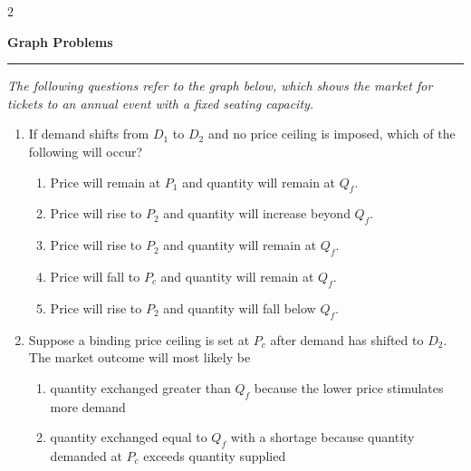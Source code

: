 \documentclass[10pt]{article}
\newenvironment{choiceslist}
  {\begin{enumerate}[label=(\Alph*), leftmargin=1.55em, itemsep=0.1em, topsep=0.15em, parsep=0pt]}
  {\end{enumerate}}
\newenvironment{stimulus}
  {\begin{center}\begin{minipage}{0.97\columnwidth}\footnotesize\itshape\setlength{\tabcolsep}{3pt}\renewcommand{\arraystretch}{0.96}}
  {\end{minipage}\end{center}}
\newcommand{\sectiontitle}[1]{%
  \vspace{0.35em}
  {\large\bfseries #1\par}
  \vspace{0.15em}
  \hrule
  \vspace{0.4em}
}
\begin{document}
\vspace{0.7em}
\begin{multicols*}{2}
\sectiontitle{Graph Problems}
\begin{stimulus}
The following questions refer to the graph below, which shows the market for tickets to an annual event with a fixed seating capacity.

\begin{center}
\end{center}
\end{stimulus}
\begin{enumerate}[series=curveq, leftmargin=*, itemsep=0.8em, topsep=0.18em, parsep=0pt]
\item If demand shifts from $D_1$ to $D_2$ and no price ceiling is imposed, which of the following will occur?
\begin{choiceslist}
\item Price will remain at $P_1$ and quantity will remain at $Q_f$.
\item Price will rise to $P_2$ and quantity will increase beyond $Q_f$.
\item Price will rise to $P_2$ and quantity will remain at $Q_f$.
\item Price will fall to $P_c$ and quantity will remain at $Q_f$.
\item Price will rise to $P_2$ and quantity will fall below $Q_f$.
\end{choiceslist}
\item Suppose a binding price ceiling is set at $P_c$ after demand has shifted to $D_2$. The market outcome will most likely be
\begin{choiceslist}
\item quantity exchanged greater than $Q_f$ because the lower price stimulates more demand
\item quantity exchanged equal to $Q_f$ with a shortage because quantity demanded at $P_c$ exceeds quantity supplied

\end{choiceslist}
\end{enumerate}
\end{multicols*}
\end{document}
